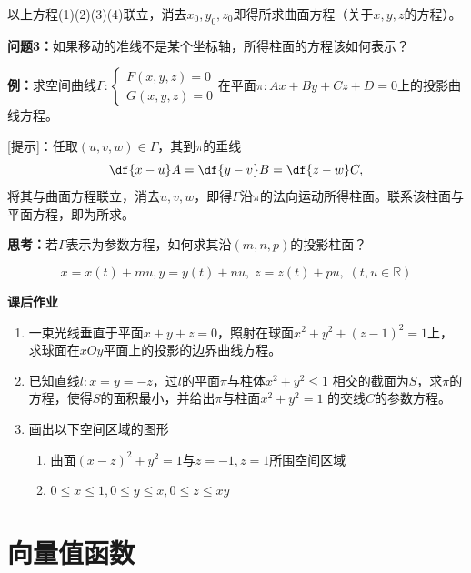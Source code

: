 以上方程(1)(2)(3)(4)联立，消去$x_0,y_0,z_0$即得所求曲面方程（关于$x,y,z$的方程）。

{\bf 问题3：}如果移动的准线不是某个坐标轴，所得柱面的方程该如何表示？

{\bf 例：}求空间曲线$\Gamma:\left\{\begin{array}{l}
F(x,y,z)=0\\ G(x,y,z)=0
\end{array}\right.$在平面$\pi:Ax+By+Cz+D=0$上的投影曲线方程。

[提示]：任取$(u,v,w)\in\Gamma$，其到$\pi$的垂线
$$\df{x-u}A=\df{y-v}B=\df{z-w}C,$$
将其与曲面方程联立，消去$u,v,w$，即得$\Gamma$沿$\pi$的法向运动所得柱面。联系该柱面与
平面方程，即为所求。

{\bf 思考：}若$\Gamma$表示为参数方程，如何求其沿$(m,n,p)$的投影柱面？

$$x=x(t)+mu,y=y(t)+nu,\;z=z(t)+pu,\;(t,u\in\mathbb{R})$$

\begin{ext}
	{\bf 课后作业}
	\begin{enumerate}
	  \item 一束光线垂直于平面$x+y+z=0$，照射在球面$x^2+y^2+(z-1)^2=1$上，
	  求球面在$xOy$平面上的投影的边界曲线方程。
	  \item 已知直线$l:x=y=-z$，过$l$的平面$\pi$与柱体$x^2+y^2\leq1$
	  相交的截面为$S$，求$\pi$的方程，使得$S$的面积最小，并给出$\pi$与柱面$x^2+y^2=1$
	  的交线$C$的参数方程。
	  \item 画出以下空间区域的图形
	  \begin{enumerate}[(1)]
	    \item 曲面$(x-z)^2+y^2=1$与$z=-1,z=1$所围空间区域
	    \item $0\leq x\leq 1,0\leq y\leq x,0\leq z\leq xy$
	  \end{enumerate}
	\end{enumerate}
\end{ext}

\section{向量值函数}

